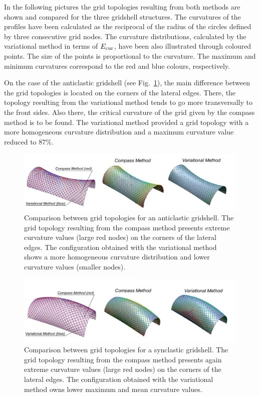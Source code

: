 In the following pictures the grid topologies resulting from both methods are shown and compared for the three gridshell structures. The curvatures of the profiles have been calculated as the reciprocal of the radius of the circles defined by three consecutive grid nodes. The curvature distributions, calculated by the variational method in terms of $E_{\textrm{\scriptsize{cur}}}$, have been also illustrated through coloured points. The size of the points is proportional to the curvature. The maximum and minimum curvatures correspond to the red and blue colours, respectively.

On the case of the anticlastic gridshell (see Fig.~\ref{fig:Compass_Anti}), the main difference between the grid topologies is located on the corners of the lateral edges. There, the topology resulting from the variational method tends to go more transversally to the front sides. Also there, the critical curvature of the grid given by the compass method is to be found. The variational method provided a grid topology with a more homogeneous curvature distribution and a maximum curvature value reduced to 87\%.

\begin{figure}[t]
\centering
\includegraphics[width=1.0\linewidth]{images/CaseStudies_Regular/Compass_Anti.png}
\caption{Comparison between grid topologies for an anticlastic gridshell. The grid topology resulting from the compass method presents extreme curvature values (large red nodes) on the corners of the lateral edges. The configuration obtained with the variational method shows a more homogeneous curvature distribution and lower curvature values (smaller nodes).}
\label{fig:Compass_Anti}
\end{figure}

\begin{figure}[b]
\centering
\includegraphics[width=1.0\linewidth]{images/CaseStudies_Regular/Compass_syn.png}
\caption{Comparison between grid topologies for a synclastic gridshell. The grid topology resulting from the compass method presents again extreme curvature values (large red nodes) on the corners of the lateral edges. The configuration obtained with the variational method owns lower maximum and mean curvature values.}
\label{fig:Compass_Syn}
\end{figure}

